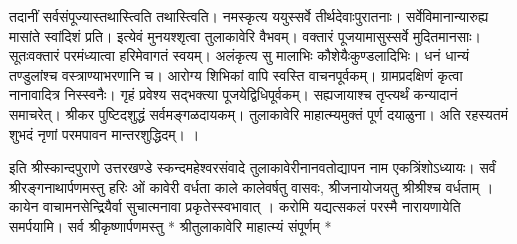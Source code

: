 तदानीं सर्वसंपूज्यास्तथास्त्विति तथास्त्विति।
 नमस्कृत्य ययुस्सर्वे तीर्थदेवाःपुरातनाः।
 सर्वेविमानान्यारुह्य मासांते स्वांदिशं प्रति।
 इत्येवं मुनयश्शृत्वा तुलाकावेरि वैभवम्।
 वक्तारं पूजयामासुस्सर्वे मुदितमानसाः।
 सूतःवक्तारं परमंध्यात्वा हरिमेवागतं स्वयम्।
 अलंकृत्य सु मालाभिः कौशेयैःकुण्डलादिभिः।
 धनं धान्यं तण्डुलांश्च वस्त्राण्याभरणानि च।
 आरोग्य शिभिकां वापि स्वस्ति वाचनपूर्वकम्।
 ग्रामप्रदक्षिणं कृत्वा नानावादित्र निस्स्वनैः।
 गृहं प्रवेश्य सद्भक्त्या पूजयेद्विधिपूर्वकम्।
 सह्यजायाश्च तृप्त्यर्थं कन्यादानं समाचरेत्।
 श्रीकर पुष्टिदशुद्धं सर्वमङ्गळदायकम्।
 तुलाकावेरि माहात्म्यमुक्तं पूर्ण दयाळुना।
 अति रहस्यतमं शुभदं नृणां
परमपावन मान्तरशुद्धिदम्।
।

इति श्रीस्कान्दपुराणे उत्तरखण्डे स्कन्दमहेश्वरसंवादे तुलाकावेरीनानवतोद्यापन नाम 
एकत्रिंशोऽध्यायः। सर्वं श्रीरङ्गनाथार्पणमस्तु 
हरिः ओं कावेरी वर्धता काले कालेवर्षतु वासवः, श्रीजनायोजयतु श्रीश्रीश्च वर्धताम् । 
कायेन वाचामनसेन्द्रियैर्वा सुचात्मनावा प्रकृतेस्स्वभावात् । करोमि यद्यत्सकलं परस्मै नारायणायेति समर्पयामि। 
सर्व श्रीकृष्णार्पणमस्तु 
* 
श्रीतुलाकावेरि माहात्म्यं संपूर्णम् *